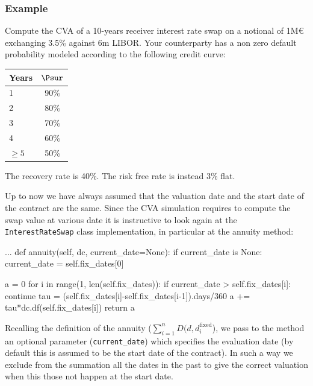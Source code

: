 \subsubsection{Example}
Compute the CVA of a 10-years receiver interest rate swap on a notional of 1M€ exchanging 3.5\% against 6m LIBOR.
Your counterparty has a non zero default probability modeled according to the following credit curve:
\begin{table}
	\begin{center}
	\begin{tabular}{l|c}
Years & $\Psur$ \\
\hline
1 & 90\% \\
\hline
2 & 80\% \\
\hline
3 & 70\% \\
\hline
4 & 60\% \\
\hline
$\ge5$ & 50\% \\
\end{tabular}
\end{center}
\end{table}

The recovery rate is 40\%. The risk free rate is instead 3\% flat.

\begin{finmarkets}
Up to now we have always assumed that the valuation date and the start date of the contract are the same.
Since the CVA simulation requires to compute the swap value at various date it is instructive to look again at the \texttt{InterestRateSwap} class implementation, in particular at the annuity method:

\begin{ipythonbox}
...
    def annuity(self, dc, current_date=None):
        if current_date is None:
            current_date = self.fix_dates[0]

        a = 0
        for i in range(1, len(self.fix_dates)):
            if current_date > self.fix_dates[i]:
                continue
            tau = (self.fix_dates[i]-self.fix_dates[i-1]).days/360
            a += tau*dc.df(self.fix_dates[i])
        return a
\end{ipythonbox}

Recalling the definition of the annuity ($\sum_{i=1}^{n}D(d, d_{i}^{\mathrm{fixed}}$), we pass to the method an optional parameter (\texttt{current\_date}) which specifies the evaluation date (by default this is assumed to be the start date of the contract). In such a way we exclude from the summation all the dates in the past to give the correct valuation when this those not happen at the start date.
\end{finmarkets}

